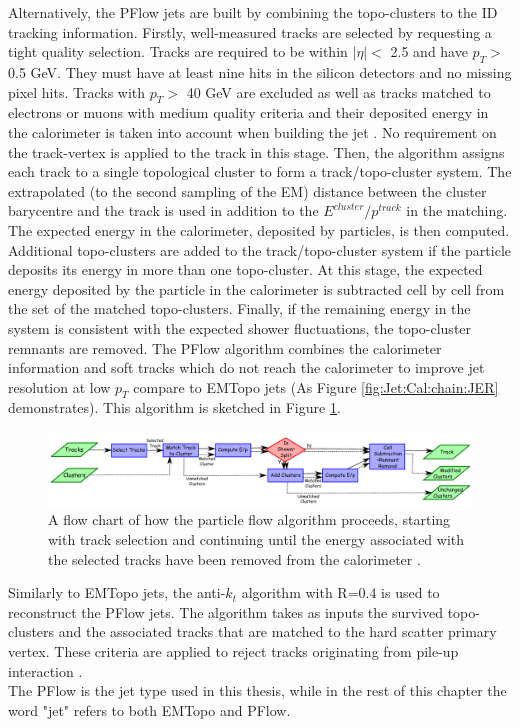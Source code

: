 Alternatively, the PFlow jets are built by combining the topo-clusters to the ID tracking information. Firstly, well-measured tracks are selected by requesting a tight quality selection. Tracks are required to be within $|\eta|<$ 2.5 and have $p_T>$ 0.5 GeV. They must have at least nine hits in the silicon detectors and no missing pixel hits. Tracks with $p_T>$ 40 GeV are excluded as well as tracks matched to electrons or muons with medium quality criteria and their deposited energy in the calorimeter is taken into account when building the jet \cite{PFlow_Reco}. No requirement on the track-vertex is applied to the track in this stage. Then, the algorithm assigns each track to a single topological cluster to form a track/topo-cluster system. The extrapolated (to the second sampling of the EM) distance between the cluster barycentre and the track is used in addition to the $E^{cluster}/p^{track}$ in the matching. The expected energy in the calorimeter, deposited by particles, is then computed. Additional topo-clusters are added to the track/topo-cluster system if the particle deposits its energy in more than one topo-cluster. At this stage, the expected energy deposited by the particle in the calorimeter is subtracted cell by cell from the set of the matched topo-clusters. Finally, if the remaining energy in the system is consistent with the expected shower fluctuations, the topo-cluster remnants are removed. The PFlow algorithm combines the calorimeter information and soft tracks which do not reach the calorimeter to improve jet resolution at low $p_T$ compare to EMTopo jets (As Figure \ref{fig:Jet:Cal:chain:JER} demonstrates). This algorithm is sketched in Figure \ref{fig:Jet:JR:PFlowSketch}. 

\begin{figure}[htbp]
    \centering
    \includegraphics[width=1.\textwidth]{Ch4/Img/PFlow_Algo.png}
    \caption{A flow chart of how the particle flow algorithm proceeds, starting with track selection and continuing until the energy associated with the selected tracks have been removed from the calorimeter \cite{PFlow_Reco}.}
    \label{fig:Jet:JR:PFlowSketch}
\end{figure}
Similarly to EMTopo jets, the anti-$k_t$ algorithm with R=0.4 is used to reconstruct the PFlow jets. The algorithm takes as inputs the survived topo-clusters and the associated tracks that are matched to the hard scatter primary vertex. These criteria are applied to reject tracks originating from pile-up interaction \cite{Jet_pileUp}. \\
The PFlow is the jet type used in this thesis, while in the rest of this chapter the word "jet" refers to both EMTopo and PFlow.

